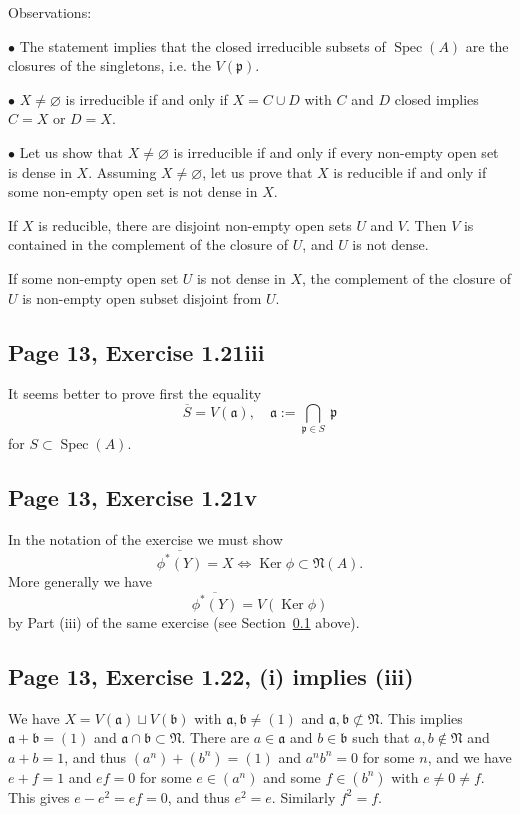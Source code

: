 \documentclass[parskip=half,fontsize=12pt]{scrartcl}%
\newcommand{\oo}{\operatorname}\newcommand{\ooo}{\operatorname*}
\newcommand{\mf}{\mathfrak}
\newcommand{\aaa}{\mf a}
\newcommand{\bbb}{\mf b}
\newcommand{\ppp}{\mf p}
\newcommand{\bu}{\bullet}
\newcommand{\Ker}{\operatorname{Ker}}\newcommand{\Coker}{\operatorname{Coker}}
\newcommand{\Spec}{\operatorname{Spec}}\newcommand{\Sp}{\operatorname{Spec}}
\begin{document}
Observations:

$\bu$ The statement implies that the closed irreducible subsets of $\Spec(A)$ are the closures of the singletons, i.e. the $V(\ppp)$. 

$\bu$ $X\ne\varnothing$ is irreducible if and only if $X=C\cup D$ with $C$ and $D$ closed implies $C=X$ or $D=X$. 

$\bu$ Let us show that $X\ne\varnothing$ is irreducible if and only if every non-empty open set is dense in $X$. Assuming $X\ne\varnothing$, let us prove that $X$ is reducible if and only if some non-empty open set is not dense in $X$. 

If $X$ is reducible, there are disjoint non-empty open sets $U$ and $V$. Then $V$ is contained in the complement of the closure of $U$, and $U$ is not dense. 

If some non-empty open set $U$ is not dense in $X$, the complement of the closure of $U$ is non-empty open subset disjoint from $U$. 

\subsection{Page 13, Exercise 1.21iii}\label{121iii}%

It seems better to prove first the equality 
$$
\overline S=V(\mf a),\quad \mf a:=\bigcap_{\ppp\in S}\ \ppp
$$ 
for $S\subset\oo{Spec}(A)$.

\subsection{Page 13, Exercise 1.21v}\label{121v}%

In the notation of the exercise we must show 
$$
\overline{\phi^*(Y)}=X\iff\Ker\phi\subset\mf N(A).
$$ 
More generally we have 
$$
\overline{\phi^*(Y)}=V(\Ker\phi)
$$ 
by Part (iii) of the same exercise (see Section~\ref{121iii} above).

\subsection{Page 13, Exercise 1.22, (i) implies (iii)}%

We have $X=V(\aaa)\sqcup V(\bbb)$ with $\aaa,\bbb\ne(1)$ and $\aaa,\bbb\not\subset\mf N$. This implies $\aaa+\bbb=(1)$ and $\aaa\cap\bbb\subset\mf N$. There are $a\in\aaa$ and $b\in\bbb$ such that $a,b\notin\mf N$ and $a+b=1$, and thus $(a^n)+(b^n)=(1)$ and $a^nb^n=0$ for some $n$, and we have $e+f=1$ and $ef=0$ for some $e\in(a^n)$ and some $f\in(b^n)$ with $e\ne0\ne f$. This gives $e-e^2=ef=0$, and thus $e^2=e$. Similarly $f^2=f$.
\end{document}
